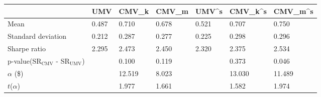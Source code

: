 \begin{tabular}{lllllll}
\toprule
 & UMV & CMV_k & CMV_m & UMV^s & CMV_k^s & CMV_m^s \\
\midrule
Mean & 0.487 & 0.710 & 0.678 & 0.521 & 0.707 & 0.750 \\
Standard deviation & 0.212 & 0.287 & 0.277 & 0.225 & 0.298 & 0.296 \\
Sharpe ratio & 2.295 & 2.473 & 2.450 & 2.320 & 2.375 & 2.534 \\
p-value(SR$_{\text{CMV}}$ - SR$_{\text{UMV}}$) &  & 0.100 & 0.119 &  & 0.373 & 0.046 \\
$\alpha$ (\$) &  & 12.519 & 8.023 &  & 13.030 & 11.489 \\
$t$($\alpha$) &  & 1.977 & 1.661 &  & 1.582 & 1.974 \\
\bottomrule
\end{tabular}
